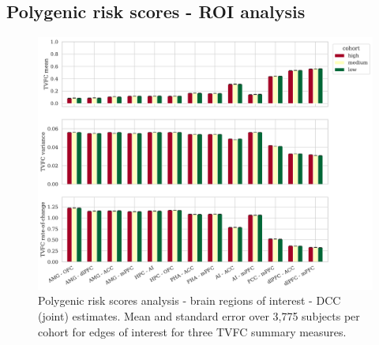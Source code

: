


\clearpage
\subsection{Polygenic risk scores - ROI analysis}


\begin{figure}[h]
    \centering
    \includegraphics[width=\textwidth]{fig/ukbiobank/TVFC_predictions_summaries/pgs/cohort_comparison/ROI/correlation_all_TVFC_summary_measures_DCC_joint_edges_of_interest}
    \caption{
        Polygenic risk scores analysis - brain regions of interest - DCC (joint) estimates.
        Mean and standard error over 3,775 subjects per cohort for edges of interest for three TVFC summary measures.
    }\label{fig:ukb-results-pgs-roi-cohort-comparison-edges-of-interest-dcc-j}
\end{figure}


